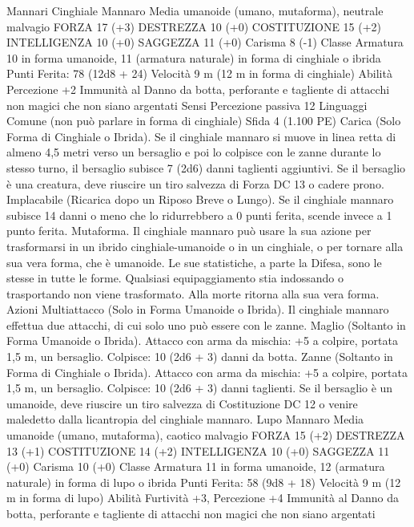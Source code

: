\begin{multicols}{2}
Mannari
Cinghiale Mannaro
Media umanoide (umano, mutaforma), neutrale malvagio
FORZA 17 (+3)
DESTREZZA 10 (+0)
COSTITUZIONE 15 (+2)
INTELLIGENZA 10 (+0)
SAGGEZZA 11 (+0)
Carisma 8 (-1)
Classe Armatura 10 in forma umanoide, 11 (armatura naturale)
in forma di cinghiale o ibrida
\hspace*{0pt}\hfill{Punti Ferita}: 78 (12d8 + 24)
Velocità 9 m (12 m in forma di cinghiale)
Abilità Percezione +2
Immunità al Danno da botta, perforante e tagliente di
attacchi non magici che non siano argentati
Sensi Percezione passiva 12
Linguaggi Comune (non può parlare in forma di cinghiale)
Sfida 4 (1.100 PE)
Carica (Solo Forma di Cinghiale o Ibrida). Se il cinghiale
mannaro si muove in linea retta di almeno 4,5 metri verso un
bersaglio e poi lo colpisce con le zanne durante lo stesso turno, il
bersaglio subisce 7 (2d6) danni taglienti aggiuntivi. Se il
bersaglio è una creatura, deve riuscire un tiro salvezza di Forza
DC 13 o cadere prono.
Implacabile (Ricarica dopo un Riposo Breve o Lungo). Se il
cinghiale mannaro subisce 14 danni o meno che lo ridurrebbero a
0 punti ferita, scende invece a 1 punto ferita.
Mutaforma. Il cinghiale mannaro può usare la sua azione per
trasformarsi in un ibrido cinghiale-umanoide o in un cinghiale, o
per tornare alla sua vera forma, che è umanoide. Le sue
statistiche, a parte la Difesa, sono le stesse in tutte le forme.
Qualsiasi equipaggiamento stia indossando o trasportando non
viene trasformato. Alla morte ritorna alla sua vera forma.
Azioni
Multiattacco (Solo in Forma Umanoide o Ibrida). Il cinghiale
mannaro effettua due attacchi, di cui solo uno può essere con le
zanne.
Maglio (Soltanto in Forma Umanoide o Ibrida). Attacco con
arma da mischia: +5 a colpire, portata 1,5 m, un bersaglio.
Colpisce: 10 (2d6 + 3) danni da botta.
Zanne (Soltanto in Forma di Cinghiale o Ibrida). Attacco con
arma da mischia: +5 a colpire, portata 1,5 m, un bersaglio.
Colpisce: 10 (2d6 + 3) danni taglienti. Se il bersaglio è un
umanoide, deve riuscire un tiro salvezza di Costituzione DC 12 o
venire maledetto dalla licantropia del cinghiale mannaro.
Lupo Mannaro
Media umanoide (umano, mutaforma), caotico malvagio
FORZA 15 (+2)
DESTREZZA 13 (+1)
COSTITUZIONE 14 (+2)
INTELLIGENZA 10 (+0)
SAGGEZZA 11 (+0)
Carisma 10 (+0)
Classe Armatura 11 in forma umanoide, 12 (armatura naturale)
in forma di lupo o ibrida
\hspace*{0pt}\hfill{Punti Ferita}: 58 (9d8 + 18)
Velocità 9 m (12 m in forma di lupo)
Abilità Furtività +3, Percezione +4
Immunità al Danno da botta, perforante e tagliente di
attacchi non magici che non siano argentati

\end{multicols}
